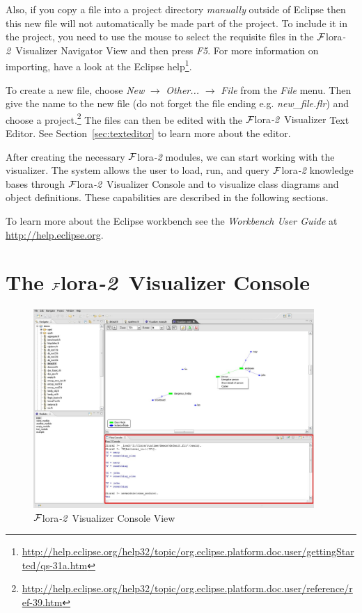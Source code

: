 \documentclass[a4paper,11pt]{article}
\newcommand{\FLORA}{{\mbox{\sc ${\cal F}${lora}\rm\emph{-2}}}\xspace}
\newcommand{\FVIZ}{{\mbox{\sc ${\cal F}${lora}\rm\emph{-2} {Visualizer}}}\xspace}
\begin{document}
Also, if you copy a file into a project directory \emph{manually} outside
of Eclipse then this new file will not automatically be made part of the
project.  To include it in the project, you need to use the mouse to
select the requisite
files in the \FVIZ Navigator View and then press \emph{F5}.
For more information on importing, have a look at the Eclipse help\footnote{
  \url{http://help.eclipse.org/help32/topic/org.eclipse.platform.doc.user/gettingStarted/qs-31a.htm}
}.

To create a new file, choose
\emph{New} $\rightarrow$ \emph{Other...}
$\rightarrow$ \emph{File} from the \emph{File} menu. 
Then give the name to the new file (do not forget the file ending
e.g. \emph{new\_file.flr}) and choose a project.\footnote{
\url{http://help.eclipse.org/help32/topic/org.eclipse.platform.doc.user/reference/ref-39.htm}
}
The files can then be edited with the \FVIZ Text Editor.
See Section~\ref{sec:texteditor} to learn more about the editor.

After creating the necessary \FLORA modules, we can start working with the
visualizer. The system allows the user to load, run, and query \FLORA
knowledge bases through \FVIZ Console and to visualize class diagrams
and object definitions. These capabilities are described in the following
sections.

To learn more about the Eclipse workbench see the \emph{Workbench User Guide} at
\url{http://help.eclipse.org}.

\section{The \FVIZ Console}
\label{sec:consoleview}

\begin{figure}[tbh]
	\centering
		\includegraphics[width=0.95\textwidth]{fviz_console}
	\caption{\FVIZ Console View}
	\label{fig:fviz_console}
\end{figure}
\end{document}
